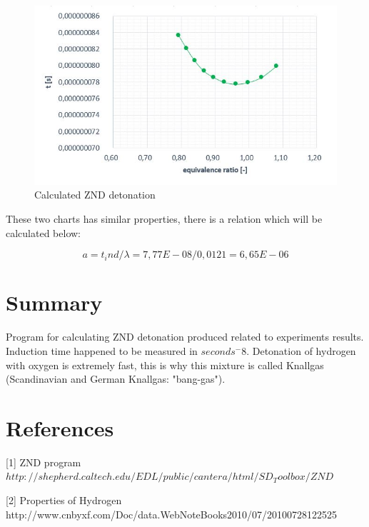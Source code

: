 \documentclass[a4paper]{article}
\begin{document}
\begin{figure}[H]
\includegraphics[width=1\textwidth]{ZND.JPG}
\caption{\label{fig:p}Calculated ZND detonation}
\end{figure}

These two charts has similar properties, there is a relation which will be calculated below:

\begin{equation}
    a = t_ind/\lambda=7,77E-08/0,0121=6,65E-06
 \end{equation}   

\section{Summary}\label{sec:summary}
Program for calculating ZND detonation produced related to experiments results. Induction time happened to be measured in $seconds^-8$. Detonation of hydrogen with oxygen is extremely fast, this is why this mixture is called Knallgas (Scandinavian and German Knallgas: "bang-gas").


\section{References}\label{sec:refs}

 
[1] ZND program  \newline
$http://shepherd.caltech.edu/EDL/public/cantera/html/SD_Toolbox/ZND$

[2] Properties of Hydrogen \newline
http://www.cnbyxf.com/Doc/data.WebNoteBooks2010/07/20100728122525
\end{document}
